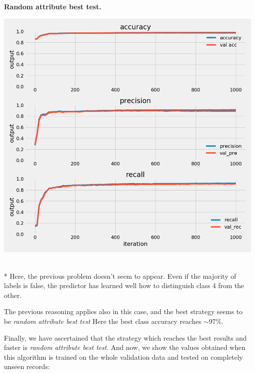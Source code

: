 \documentclass{article}
\begin{document}
\begin{multicols}{2}
	\begin{minipage}[t]{1\columnwidth}
	\begin{center}
	\textbf{Random attribute best test.}\par\medskip
	\includegraphics[width=0.9\columnwidth]{../images/random_selctor_best_test_class_4_cross_val_4.png}
	\label{best}
	\end{center}
	\end{minipage}
	\text{ }
	\\*
	Here, the previous problem doesn't seem to appear. 
	Even if the majority of labels is false, the predictor has learned well how to distinguish class 4 from the other.
	
	The previous reasoning applies also in this case, and the best strategy seems to be \textit{random attribute best test}
	Here the best class accuracy reaches $\sim 97\%$. 
\end{multicols}
\newpage


Finally, we have ascertained that the strategy which reaches the best results and faster is \textit{random attribute best test}.
And now, we show the values obtained when this algorithm is trained on the whole validation data and tested on
completely unseen records:
\end{document}
